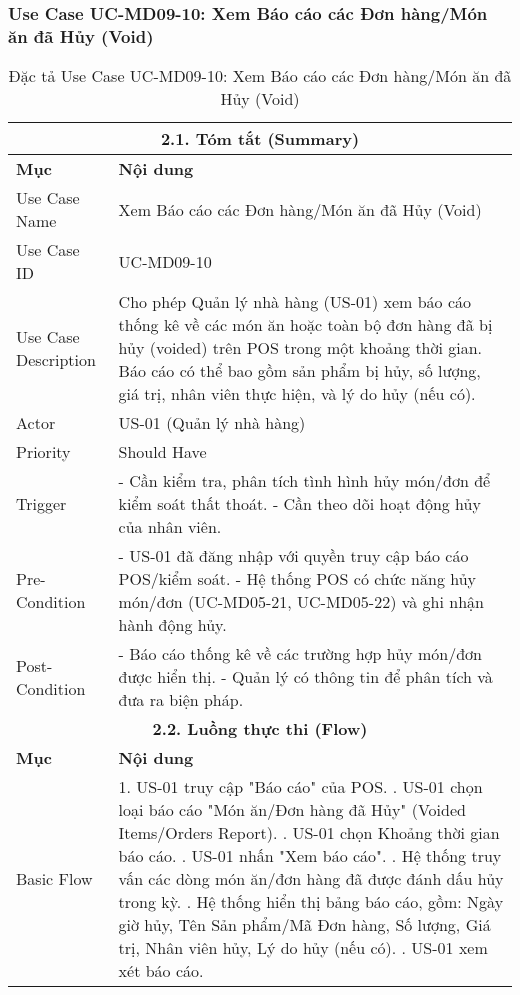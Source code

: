 \subsubsection{Use Case UC-MD09-10: Xem Báo cáo các Đơn hàng/Món ăn đã Hủy (Void)}
\begin{longtable}{|m{4cm}|p{11cm}|}
\caption{Đặc tả Use Case UC-MD09-10: Xem Báo cáo các Đơn hàng/Món ăn đã Hủy (Void)} \label{tab:uc_md09_10_corrected} \\
\hline
\multicolumn{2}{|c|}{\textbf{2.1. Tóm tắt (Summary)}} \\
\hline
\textbf{Mục} & \textbf{Nội dung} \\
\hline
\endhead %
\midrule
\endfoot %
\bottomrule
\endlastfoot %
Use Case Name & Xem Báo cáo các Đơn hàng/Món ăn đã Hủy (Void) \\
\hline
Use Case ID & UC-MD09-10 \\
\hline
Use Case Description & Cho phép Quản lý nhà hàng (US-01) xem báo cáo thống kê về các món ăn hoặc toàn bộ đơn hàng đã bị hủy (voided) trên POS trong một khoảng thời gian. Báo cáo có thể bao gồm sản phẩm bị hủy, số lượng, giá trị, nhân viên thực hiện, và lý do hủy (nếu có). \\
\hline
Actor & US-01 (Quản lý nhà hàng) \\
\hline
Priority & Should Have \\
\hline
Trigger & - Cần kiểm tra, phân tích tình hình hủy món/đơn để kiểm soát thất thoát. \newline - Cần theo dõi hoạt động hủy của nhân viên. \\
\hline
Pre-Condition & - US-01 đã đăng nhập với quyền truy cập báo cáo POS/kiểm soát. \newline - Hệ thống POS có chức năng hủy món/đơn (UC-MD05-21, UC-MD05-22) và ghi nhận hành động hủy. \\
\hline
Post-Condition & - Báo cáo thống kê về các trường hợp hủy món/đơn được hiển thị. \newline - Quản lý có thông tin để phân tích và đưa ra biện pháp. \\
\hline
\multicolumn{2}{|c|}{\textbf{2.2. Luồng thực thi (Flow)}} \\
\hline
\textbf{Mục} & \textbf{Nội dung} \\
\hline
Basic Flow & 1. US-01 truy cập "Báo cáo" của POS. \newline 2. US-01 chọn loại báo cáo "Món ăn/Đơn hàng đã Hủy" (Voided Items/Orders Report). \newline 3. US-01 chọn Khoảng thời gian báo cáo. \newline 4. US-01 nhấn "Xem báo cáo". \newline 5. Hệ thống truy vấn các dòng món ăn/đơn hàng đã được đánh dấu hủy trong kỳ. \newline 6. Hệ thống hiển thị bảng báo cáo, gồm: Ngày giờ hủy, Tên Sản phẩm/Mã Đơn hàng, Số lượng, Giá trị, Nhân viên hủy, Lý do hủy (nếu có). \newline 7. US-01 xem xét báo cáo. \\

\end{longtable}
